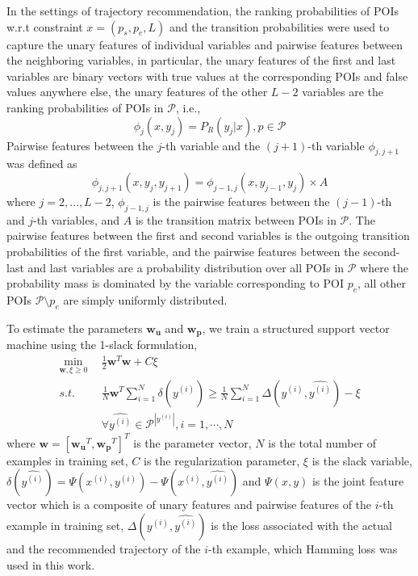 In the settings of trajectory recommendation, the ranking probabilities of POIs w.r.t constraint $x = (p_s, p_e, L)$
and the transition probabilities were used to capture the unary features of individual variables and pairwise features
between the neighboring variables, in particular, the unary features of the first and last variables are binary vectors 
with true values at the corresponding POIs and false values anywhere else,
the unary features of the other $L-2$ variables are the ranking probabilities of POIs in $\mathcal{P}$, i.e.,
\begin{displaymath}
    \phi_j(x, y_j) = P_R(y_j | x), p \in \mathcal{P}
\end{displaymath}
Pairwise features between the $j$-th variable and the $(j+1)$-th variable $\phi_{j, j+1}$ was defined as
\begin{displaymath}
    \phi_{j, j+1}(x, y_j, y_{j+1}) = \phi_{j-1, j}(x, y_{j-1}, y_j) \times A 
\end{displaymath}
where $j=2, \dots, L-2$, $\phi_{j-1, j}$ is the pairwise features between the $(j-1)$-th and $j$-th variables, 
and $A$ is the transition matrix between POIs in $\mathcal{P}$.
The pairwise features between the first and second variables is the outgoing transition probabilities of the first variable,
and the pairwise features between the second-last and last variables are a probability distribution over all POIs in 
$\mathcal{P}$ where the probability mass is dominated by the variable corresponding to POI $p_e$,
all other POIs $\mathcal{P} \setminus p_e$ are simply uniformly distributed.


To estimate the parameters $\mathbf{w_u}$ and $\mathbf{w_p}$, we train a structured support vector machine using the 1-slack
formulation\cite{ssvm09},
\begin{align*}
    \min_{\mathbf{w}, \xi \ge 0} ~~& \frac{1}{2} \mathbf{w}^T \mathbf{w} + C \xi \\
    s.t. ~~& \frac{1}{N} \mathbf{w}^T \sum_{i=1}^N \delta(\hat{y^{(i)}}) \ge 
             \frac{1}{N} \sum_{i=1}^N \Delta(y^{(i)}, \hat{y^{(i)}}) - \xi \\
           & \forall \hat{y^{(i)}} \in \mathcal{P}^{|y^{(i)}|}, i = 1, \cdots, N
\end{align*}
where $\mathbf{w} = [\mathbf{w_u}^T, \mathbf{w_p}^T]^T$ is the parameter vector, 
$N$ is the total number of examples in training set, $C$ is the regularization parameter,
$\xi$ is the slack variable, $\delta(\hat{y^{(i)}}) = \Psi(x^{(i)}, y^{(i)}) - \Psi(x^{(i)}, \hat{y^{(i)}})$ and 
$\Psi(x, y)$ is the joint feature vector which is a composite of unary features and pairwise features of the 
$i$-th example in training set, $\Delta(y^{(i)}, \hat{y^{(i)}})$ is the loss associated with the actual and 
the recommended trajectory of the $i$-th example, which Hamming loss was used in this work.

